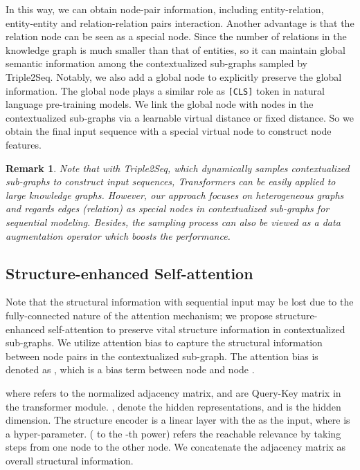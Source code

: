 \documentclass[sigconf]{acmart}
\newtheorem{remark}{\noindent \textbf{Remark}}
\newcommand{\bizhen}[1]{{\color{black}#1}}
\begin{document}
In this way, we can obtain node-pair information, including entity-relation, entity-entity and relation-relation pairs interaction.
Another advantage is that the relation node can be seen as a special node.
Since the number of relations in the knowledge graph is much smaller than that of entities, so it can maintain global semantic information among the contextualized sub-graphs sampled by Triple2Seq.
Notably, we also add a \bizhen{global node} to explicitly preserve the global information.
The global node plays a similar role as \texttt{[CLS]} token in natural language pre-training models.
We link the global node with nodes in the contextualized sub-graphs via a learnable virtual distance or fixed distance.
So we obtain the final input sequence with a special virtual node to construct node features.

\begin{remark}
Note that with Triple2Seq, which dynamically samples contextualized sub-graphs to construct input sequences, Transformers can be easily applied to large knowledge graphs.
However, our approach focuses on heterogeneous graphs and regards edges (relation) as special nodes in contextualized sub-graphs for sequential modeling.
Besides, the sampling process can also be viewed as a data augmentation operator  which boosts the performance.
\end{remark}


\subsection{Structure-enhanced Self-attention}
\label{sec:Structural_bias}


Note that the structural information with sequential input may be lost due to the fully-connected nature of the attention mechanism; we propose structure-enhanced self-attention to preserve vital structure information in contextualized sub-graphs.
We utilize attention bias to capture the structural information between node pairs in the contextualized sub-graph.
The attention bias is denoted as , which is a bias term between node  and node .



where  refers to the normalized adjacency matrix, 
{ and  are  Query-Key matrix in the transformer module}. 
,  denote the hidden representations, {and  is the hidden dimension.} 
The structure encoder  is a linear layer with the   as the input, where  is a hyper-parameter.
 ( to the -th power) refers the reachable relevance by taking  steps from one node to the other node.
{We concatenate the adjacency matrix as overall structural information.}
\end{document}
